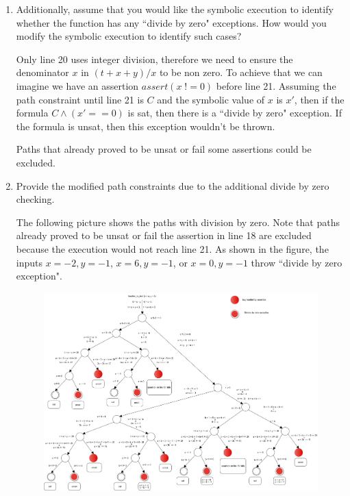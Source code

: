 \documentclass[12pt,a4paper]{article}
\begin{document}
\begin{enumerate}
\begin{enumerate}
\begin{enumerate}
\end{enumerate}

\color{black}

\item Additionally, assume that you would like the symbolic execution to identify whether the function has any ``divide by zero" exceptions. How would you modify the symbolic execution to identify such cases?


\color{blue}
Only line 20 uses integer division, therefore we need to ensure the denominator $x$ in $(t+x+y)/x$  to be non zero. To achieve that we can imagine we have an assertion $assert (x \; != 0) $ before line 21. Assuming the path constraint until line 21 is $C$ and the symbolic value of $x$ is $x'$, then if the formula $C \wedge (x' == 0)$ is sat, then there is a ``divide by zero" exception. If the formula is unsat, then this exception wouldn't be thrown. 


Paths that already proved to be unsat or fail some assertions could be excluded.


\color{black}

\item Provide the modified path constraints due to the additional divide by zero checking.

\color{blue}
The following picture shows the paths with division by zero. Note that paths already proved to be unsat or fail the assertion in line 18 are excluded because the execution would not reach line 21.  As shown in the figure, the inputs $x=-2, y = -1$, $x = 6, y = -1$, or $x=0, y = -1$ throw ``divide by zero exception".

\color{blue}
\begin{figure}[H]
 \centering
 \includegraphics[scale=.30,keepaspectratio=true]{./zero.png}
\end{figure}


\end{enumerate}
\end{enumerate}
\end{document}
